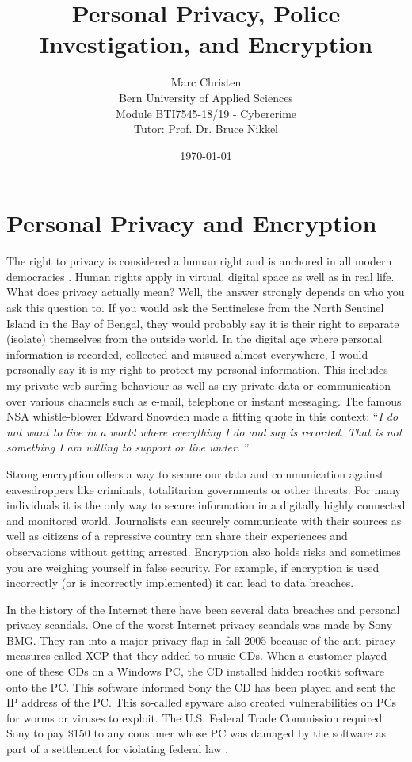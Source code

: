 \documentclass[a4paper, 11pt]{article}
\title{Personal Privacy, Police Investigation, and Encryption}
\author{Marc Christen  \\
	Bern University of Applied Sciences \\
	Module BTI7545-18/19 - Cybercrime \\
	Tutor: Prof. Dr. Bruce Nikkel \\
}
\date{\today}
\begin{document}
\maketitle
\noindent
\section*{Personal Privacy and Encryption}
The right to privacy is considered a human right and is anchored in all modern democracies \cite{ECHR}. Human rights apply in virtual, digital space as well as in real life. What does privacy actually mean? Well, the answer strongly depends on who you ask this question to. If you would ask the Sentinelese from the North Sentinel Island in the Bay of Bengal, they would probably say it is their right to separate (isolate) themselves from the outside world. In the digital age where personal information is recorded, collected and misused almost everywhere, I would personally say it is my right to protect my personal information. This includes my private web-surfing behaviour as well as my private data or communication over various channels such as e-mail, telephone or instant messaging. The famous NSA whistle-blower Edward Snowden made a fitting quote in this context: \enquote{\textit{I do not want to live in a world where everything I do and say is recorded. That is not something I am willing to support or live under.} \cite{SNOWDEN}}  
\par Strong encryption offers a way to secure our data and communication against eavesdroppers like criminals, totalitarian governments or other threats.
For many individuals it is the only way to secure information in a digitally highly connected and monitored world. Journalists can securely communicate with their sources as well as citizens of a repressive country can share their experiences and observations without getting arrested.
Encryption also holds risks and sometimes you are weighing yourself in false security. For example, if encryption is used incorrectly (or is incorrectly implemented) it can lead to data breaches.
\par In the history of the Internet there have been several data breaches and personal privacy scandals. One of the worst Internet privacy scandals was made by Sony BMG. They ran into a major privacy flap in fall 2005 because of the anti-piracy measures called XCP that they added to music CDs. When a customer played one of these CDs on a Windows PC, the CD installed hidden rootkit software onto the PC. This software informed Sony the CD has been played and sent the IP address of the PC. This so-called spyware also created vulnerabilities on PCs for worms or viruses to exploit. The U.S. Federal Trade Commission required Sony to pay \$150 to any consumer whose PC was damaged by the software as part of a settlement for violating federal law \cite{SONY}.
\end{document}
